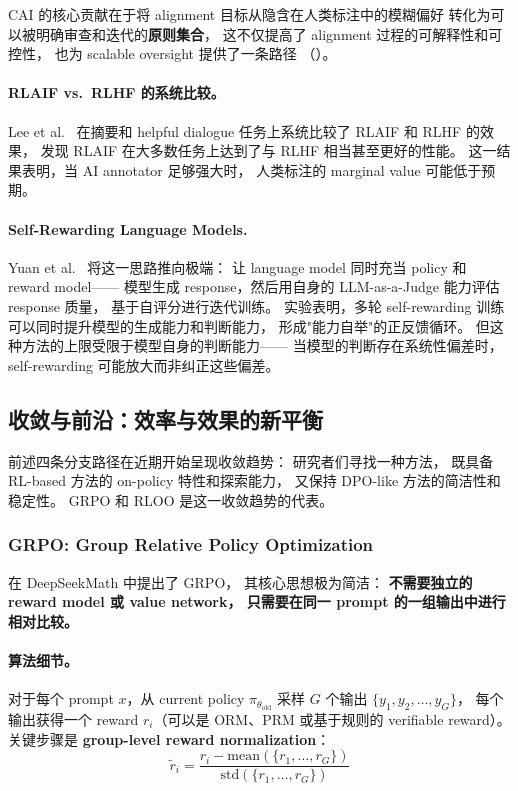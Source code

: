 \noindent
CAI 的核心贡献在于将 alignment 目标从隐含在人类标注中的模糊偏好
转化为可以被明确审查和迭代的\textbf{原则集合}，
这不仅提高了 alignment 过程的可解释性和可控性，
也为 scalable oversight 提供了一条路径
（）。

\paragraph{RLAIF vs.\ RLHF 的系统比较。}
Lee et al.\ \cite{lee2023rlaif} 在摘要和 helpful dialogue 任务上系统比较了
RLAIF 和 RLHF 的效果，
发现 RLAIF 在大多数任务上达到了与 RLHF 相当甚至更好的性能。
这一结果表明，当 AI annotator 足够强大时，
人类标注的 marginal value 可能低于预期。

\paragraph{Self-Rewarding Language Models.}
Yuan et al.\ \cite{yuan2024selfrewarding} 将这一思路推向极端：
让 language model 同时充当 policy 和 reward model——
模型生成 response，然后用自身的 LLM-as-a-Judge 能力评估 response 质量，
基于自评分进行迭代训练。
实验表明，多轮 self-rewarding 训练可以同时提升模型的生成能力和判断能力，
形成"能力自举"的正反馈循环。
但这种方法的上限受限于模型自身的判断能力——
当模型的判断存在系统性偏差时，self-rewarding 可能放大而非纠正这些偏差。

\subsection{收敛与前沿：效率与效果的新平衡}
\label{sec:t2-convergence}

前述四条分支路径在近期开始呈现收敛趋势：
研究者们寻找一种方法，
既具备 RL-based 方法的 on-policy 特性和探索能力，
又保持 DPO-like 方法的简洁性和稳定性。
GRPO 和 RLOO 是这一收敛趋势的代表。

\subsubsection{GRPO: Group Relative Policy Optimization}
\label{sec:t2-grpo}

 在 DeepSeekMath 中提出了 GRPO，
其核心思想极为简洁：
\textbf{不需要独立的 reward model 或 value network，
只需要在同一 prompt 的一组输出中进行相对比较。}

\paragraph{算法细节。}
对于每个 prompt $x$，从 current policy $\pi_{\theta_{\text{old}}}$ 采样 $G$ 个输出
$\{y_1, y_2, \ldots, y_G\}$，
每个输出获得一个 reward $r_i$（可以是 ORM、PRM 或基于规则的 verifiable reward）。
关键步骤是 \textbf{group-level reward normalization}：
\begin{equation}
\label{eq:pref:grpo-advantage}
\tilde{r}_i = \frac{r_i - \text{mean}(\{r_1, \ldots, r_G\})}{\text{std}(\{r_1, \ldots, r_G\})}
\end{equation}


